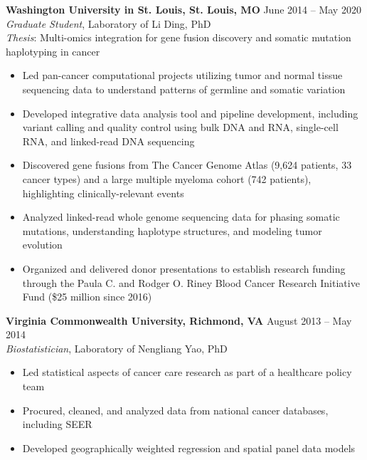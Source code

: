 \documentclass[11pt]{article}
\begin{document}
\textbf{Washington University in St. Louis, St. Louis, MO} \hfill June 2014 -- May 2020 \\
\emph{Graduate Student}, Laboratory of Li Ding, PhD \\
\emph{Thesis}: Multi-omics integration for gene fusion discovery and somatic mutation haplotyping in cancer
\begin{itemize}
	\item Led pan-cancer computational projects utilizing tumor and normal tissue sequencing data to understand patterns of germline and somatic variation
	\item Developed integrative data analysis tool and pipeline development, including variant calling and quality control using bulk DNA and RNA, single-cell RNA, and linked-read DNA sequencing
	\item Discovered gene fusions from The Cancer Genome Atlas (9,624 patients, 33 cancer types) and a large multiple myeloma cohort (742 patients), highlighting clinically-relevant events
	\item Analyzed linked-read whole genome sequencing data for phasing somatic mutations, understanding haplotype structures, and modeling tumor evolution
	\item Organized and delivered donor presentations to establish research funding through the Paula C. and Rodger O. Riney Blood Cancer Research Initiative Fund (\$25 million since 2016)
\end{itemize}

\bigskip

\textbf{Virginia Commonwealth University, Richmond, VA} \hfill August 2013 -- May 2014 \\
\emph{Biostatistician}, Laboratory of Nengliang Yao, PhD
\begin{itemize}
	\item Led statistical aspects of cancer care research as part of a healthcare policy team
	\item Procured, cleaned, and analyzed data from national cancer databases, including SEER
	\item Developed geographically weighted regression and spatial panel data models
\end{itemize}

\bigskip
\end{document}
